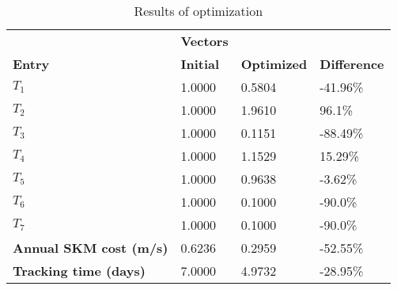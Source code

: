 \begin{table}[H]
\centering
\begin{tabular}{llll}
\textbf{}      & \cellcolor[HTML]{EFEFEF}\textbf{Vectors} & \textbf{} & \textbf{}         \\
\rowcolor[HTML]{EFEFEF} 
\textbf{Entry} & \textbf{Initial} & \textbf{Optimized} & \textbf{Difference} \\
$T_1$ & 1.0000 & 0.5804 & -41.96\% \\ 
$T_2$ & 1.0000 & 1.9610 & 96.1\% \\ 
$T_3$ & 1.0000 & 0.1151 & -88.49\% \\ 
$T_4$ & 1.0000 & 1.1529 & 15.29\% \\ 
$T_5$ & 1.0000 & 0.9638 & -3.62\% \\ 
$T_6$ & 1.0000 & 0.1000 & -90.0\% \\ 
$T_7$ & 1.0000 & 0.1000 & -90.0\% \\ 
\rowcolor[HTML]{EFEFEF} 
\textbf{Annual SKM cost (m/s)}  & 0.6236 & 0.2959 & -52.55\% \\ 
\rowcolor[HTML]{EFEFEF} 
\textbf{Tracking time (days)}  & 7.0000 & 4.9732 & -28.95\% \\ 
\end{tabular}
\caption{Results of optimization}
\label{tab:OptimizationAnalysis}
\end{table}